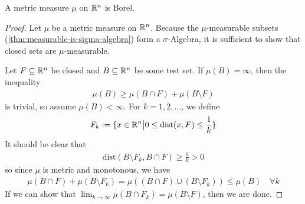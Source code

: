\begin{thm}
  \label{thm:metric-is-borel}
  A metric measure $\mu$ on $\mathbb{R}^{n}$ is Borel.
\end{thm}
\begin{proof}
  Let $\mu$ be a metric measure on $\mathbb{R}^{n}$.
  Because the $\mu$-measurable subsets (\ref{thm:measurable-is-sigma-algebra}) form a $\sigma$-Algebra, it is sufficient to show that closed sets are $\mu$-measurable.


  Let $F \subseteq \mathbb{R}^{n}$ be closed and $B \subseteq \mathbb{R}^{n}$ be some test set.
  If $\mu(B) = \infty$, then the inequality
  \begin{align*}
    \mu(B) \geq \mu(B \cap F) + \mu(B \setminus F)
  \end{align*}
  is trivial, so assume $\mu(B) < \infty$.
  For $k = 1, 2, \ldots$, we define
  \begin{align*}
    F_k := \{x \in \mathbb{R}^{n} \big\vert 0 \leq \text{dist}(x,F) \leq \frac{1}{k}\}
  \end{align*}
  It should be clear that 
  \begin{align*}
    \text{dist}(B \setminus F_k, B \cap F) \geq \frac{1}{k} > 0
  \end{align*}
  so since $\mu$ is metric and monotonous, we have
  \begin{align*}
    \mu(B \cap F) + \mu(B \setminus F_k) = \mu((B \cap F) \cup (B \setminus F_k)) \leq \mu(B) \quad \forall k
  \end{align*}
  If we can show that $\lim_{k \to \infty} \mu(B \cap F_k) = \mu(B \setminus F)$, then we are done.


\end{proof}
